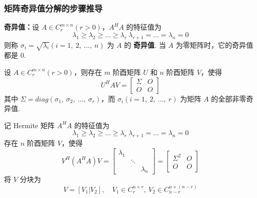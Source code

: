         \subsubsection{矩阵奇异值分解的步骤推导}
            \textbf{奇异值：}设 $A \in C_r^{m \times n}(r > 0)$，$A^HA$ 的特征值为 
            \begin{equation*}
                \lambda_1 \geq \lambda_2 \geq \dots \geq \lambda_r \> \lambda_{r+1} = \dots = \lambda_n = 0
            \end{equation*}
            则称 $\sigma_i = \sqrt{\lambda_i}(i = 1, \ 2, \ \dots, \ n)$ 为 $A$ 的 \textbf{奇异值}. 当 $A$ 为零矩阵时，它的奇异值都是 $0$.
            \par 设 $A \in C_r^{m \times n}(r > 0)$，则存在 $m$ 阶酉矩阵 $U$ 和 $n$ 阶酉矩阵 $V$，使得
            \begin{equation*}
                U^HAV = \begin{bmatrix}
                    \varSigma & O \\ O & O
                \end{bmatrix}
            \end{equation*}
            其中 $\varSigma = diag(\sigma_1, \ \sigma_2, \ \dots, \ \sigma_r)$，而 $\sigma_i(i = 1, \ 2, \ \dots, \ r)$ 为矩阵 $A$ 的全部非零奇异值.
            \par 记 Hermite 矩阵 $A^HA$ 的特征值为
            \begin{equation*}
                \lambda_1 \geq \lambda_2 \geq \dots \geq \lambda_r \> \lambda_{r+1} = \dots = \lambda_n = 0
            \end{equation*}
            存在 $n$ 阶酉矩阵 $V$，使得
            \begin{equation*}
                V^H(A^HA)V = \begin{bmatrix}
                    \lambda_1 & & \\ & \ddots & \\ & & \lambda_n
                \end{bmatrix} = \begin{bmatrix}
                    \varSigma^2 & O \\ O & O
                \end{bmatrix}
            \end{equation*}
            将 $V$ 分块为 
            \begin{equation*}
                V = [V_1 | V_2], \quad V_1 \in C_r^{n \times r}, \ V_2 \in C_{n-r}^{n \times (n-r)}
            \end{equation*}
